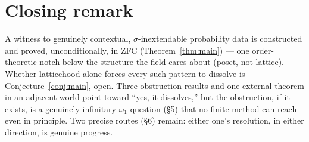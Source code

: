 \documentclass[11pt]{article}
\theoremstyle{remark}
\begin{document}
\section*{Closing remark}

A witness to genuinely contextual, $\sigma$-inextendable probability data is
constructed and proved, unconditionally, in ZFC (Theorem~\ref{thm:main}) —
one order-theoretic notch below the structure the field cares about (poset,
not lattice). Whether latticehood alone forces every such pattern to dissolve
is Conjecture~\ref{conj:main}, open. Three obstruction results and one
external theorem in an adjacent world point toward ``yes, it dissolves,'' but
the obstruction, if it exists, is a genuinely infinitary $\omega_1$-question
(\S5) that no finite method can reach even in principle. Two precise routes
(\S6) remain: either one's resolution, in either direction, is genuine
progress.
\end{document}
